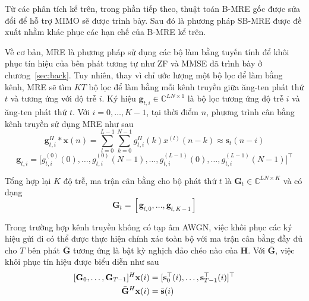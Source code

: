 Từ các phân tích kể trên, trong phần tiếp theo, thuật toán B-MRE gốc được sửa đổi để hỗ trợ MIMO sẽ được trình bày. Sau đó là phương pháp SB-MRE được đề xuất nhằm khác phục các hạn chế của B-MRE kể trên.

Về cơ bản, MRE là phương pháp sử dụng các bộ làm bằng tuyến tính để khôi phục tín hiệu của bên phát tương tự như ZF và MMSE đã trình bày ở chương~\ref{sec:back}. Tuy nhiên, thay vì chỉ ước lượng một bộ lọc để làm bằng kênh, MRE sẽ tìm $KT$ bộ lọc để làm bằng mỗi kênh truyền giữa ăng-ten phát thứ $t$ và tương ứng với độ trễ $i$. Ký hiệu $\mathbf{g}_{t, i}  \in \mathbb{C}^{LN \times 1}$ là bộ lọc tương ứng độ trễ $i$ và ăng-ten phát thứ $t$. Với \mbox{$i=0, \ldots, K-1$}, tại thời điểm $n$, phương trình cân bằng kênh truyền sử dụng MRE như sau
\begin{equation}
    \mathbf{g}^H_{t, i} * \mathbf{x}(n)=\sum_{l=0}^{L-1}\sum_{k=0}^{N-1} g^H_{t,i}(k) x^{(l)}(n-k) \approx \mathbf{s}_t(n-i)
\end{equation}
\begin{equation}
    \mathbf{g}_{t,i}=\big[g_{t, i}^{(0)}(0), \ldots, g_{t, i}^{(0)}(N - 1), \ldots,
    g_{t, i}^{(L-1)}(0), \ldots, g_{t, i}^{(L-1)} (N-1) \big]^\top
\end{equation}

Tổng hợp lại $K$ độ trễ, ma trận cân bằng cho bộ phát thứ $t$ là
 $\mathbf{G}_t \in \mathbb{C}^{LN \times K}$ và có dạng
\begin{equation}
    \mathbf{G}_t = [\mathbf{g}_{t, 0}, \ldots, \mathbf{g}_{t, K-1}]
\end{equation}

Trong trường hợp kênh truyền không có tạp âm AWGN, việc khôi phục các ký hiệu gửi đi có thể được thực hiện chính xác toàn bộ với ma trận cân bằng đầy đủ cho $T$ bên phát $\bar{\mathbf{G}}$ tương ứng là bật kỳ nghịch đảo chéo nào của $\mathbf{H}$. Với $\bar{\mathbf{G}}$, việc khôi phục tín hiệu được biểu diễn như sau
\begin{equation}
    \begin{aligned}
        \relax[\mathbf{G}_0, \ldots, \mathbf{G}_{T-1}]^{H} 
        \mathbf{x}(i)
        &= [\mathbf{s}_0^\top(i), \ldots, \mathbf{s}^\top_{T-1}(i)]^\top \\
        \bar{\mathbf{G}}^H \mathbf{x}(i) &= \bar{\mathbf{s}}(i)
    \end{aligned}   
\end{equation}

